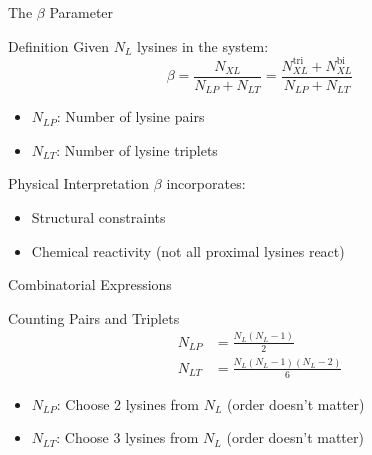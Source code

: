 \documentclass{beamer}
\begin{document}
\begin{frame}{The $\beta$ Parameter}
\begin{block}{Definition}
Given $N_L$ lysines in the system:
\begin{equation}
    \beta = \frac{N_{XL}}{N_{LP}+N_{LT}} = \frac{N^{\text{tri}}_{XL}+ N^{\text{bi}}_{XL}}{N_{LP}+N_{LT}}
\end{equation}
\end{block}

\vspace{0.3cm}

\begin{itemize}
    \item $N_{LP}$: Number of lysine pairs
    \item $N_{LT}$: Number of lysine triplets
\end{itemize}

\vspace{0.3cm}

\begin{alertblock}{Physical Interpretation}
$\beta$ incorporates:
\begin{itemize}
    \item Structural constraints
    \item Chemical reactivity (not all proximal lysines react)
\end{itemize}
\end{alertblock}
\end{frame}

\begin{frame}{Combinatorial Expressions}
\begin{block}{Counting Pairs and Triplets}
\begin{align}
    N_{LP} &= \frac{N_{L}(N_{L}-1)}{2} \\[0.3cm]
    N_{LT} &= \frac{N_{L}(N_{L}-1)(N_{L}-2)}{6}
\end{align}
\end{block}

\vspace{0.3cm}

\begin{itemize}
    \item $N_{LP}$: Choose 2 lysines from $N_L$ (order doesn't matter)
    \item $N_{LT}$: Choose 3 lysines from $N_L$ (order doesn't matter)
\end{itemize}
\end{frame}
\end{document}
